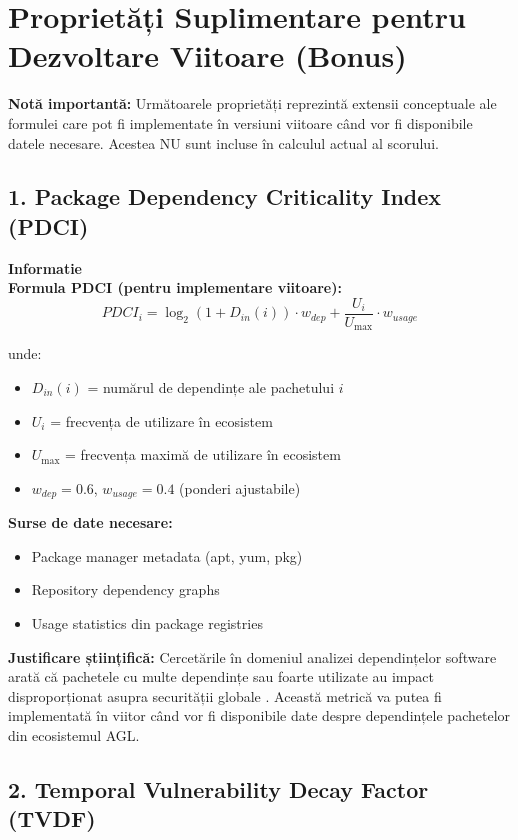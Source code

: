 \documentclass[12pt,a4paper]{article}
\newenvironment{infobox}{%
\begin{leftbar}
\color{black}
\textbf{Informatie}\\[0.5em]
}{%
\end{leftbar}
}
\begin{document}
\section{Proprietăți Suplimentare pentru Dezvoltare Viitoare (Bonus)}

\textbf{Notă importantă:} Următoarele proprietăți reprezintă extensii conceptuale ale formulei care pot fi implementate în versiuni viitoare când vor fi disponibile datele necesare. Acestea NU sunt incluse în calculul actual al scorului.

\subsection{1. Package Dependency Criticality Index (PDCI)}

\begin{infobox}
\textbf{Formula PDCI (pentru implementare viitoare):}
\[PDCI_i = \log_2(1 + D_{in}(i)) \cdot w_{dep} + \frac{U_i}{U_{\max}} \cdot w_{usage}\]

unde:
\begin{itemize}
\item $D_{in}(i)$ = numărul de dependințe ale pachetului $i$
\item $U_i$ = frecvența de utilizare în ecosistem
\item $U_{\max}$ = frecvența maximă de utilizare în ecosistem
\item $w_{dep} = 0.6$, $w_{usage} = 0.4$ (ponderi ajustabile)
\end{itemize}

\textbf{Surse de date necesare:}
\begin{itemize}
\item Package manager metadata (apt, yum, pkg)
\item Repository dependency graphs
\item Usage statistics din package registries
\end{itemize}
\end{infobox}

\textbf{Justificare științifică:} Cercetările în domeniul analizei dependințelor software arată că pachetele cu multe dependințe sau foarte utilizate au impact disproporționat asupra securității globale \cite{cox2019surviving,decan2018impact}. Această metrică va putea fi implementată în viitor când vor fi disponibile date despre dependințele pachetelor din ecosistemul AGL.

\subsection{2. Temporal Vulnerability Decay Factor (TVDF)}
\end{document}
